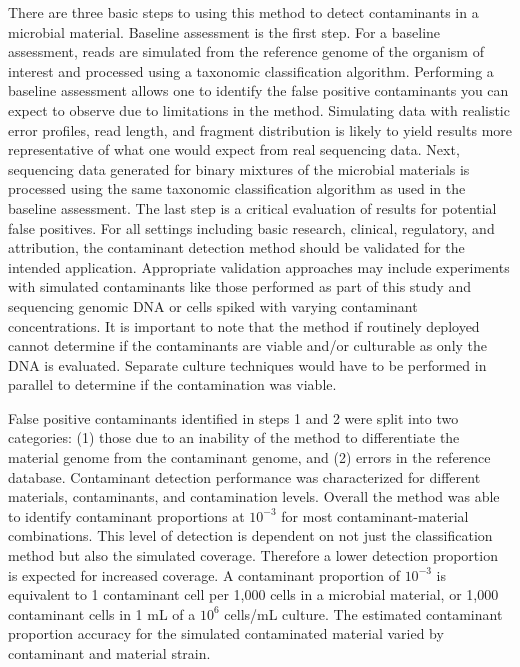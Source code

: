 \documentclass[fleqn,10pt,lineno]{wlpeerj}\usepackage[]{graphicx}\usepackage[]{color}
\begin{document}
There are three basic steps to using this method to detect contaminants in a microbial material. 
Baseline assessment is the first step. 
For a baseline assessment, reads are simulated from the reference genome of the organism of interest and processed using a taxonomic classification algorithm. 
Performing a baseline assessment allows one to identify the false positive contaminants you can expect to observe due to limitations in the method. 
Simulating data with realistic error profiles, read length, and fragment distribution is likely to yield results more representative of what one would expect from real sequencing data.
Next, sequencing data generated for binary mixtures of the microbial materials is processed using the same taxonomic classification algorithm as used in the baseline assessment.
The last step is a critical evaluation of results for potential false positives. 
For all settings including basic research, clinical, regulatory, and attribution, the contaminant detection method should be validated for the intended application.  
Appropriate validation approaches may include experiments with simulated contaminants like those performed as part of this study and sequencing genomic DNA or cells spiked with varying contaminant concentrations. It is important to note that the method if routinely deployed cannot determine if the contaminants are viable and/or culturable as only the DNA is evaluated.  Separate culture techniques would have to be performed in parallel to determine if the contamination was viable. 

False positive contaminants identified in steps 1 and 2 were split into two categories: (1) those due to an inability of the method to differentiate the material genome from the contaminant genome, and (2) errors in the reference database.
Contaminant detection performance was characterized for different materials, contaminants, and contamination levels.
Overall the method was able to identify contaminant proportions at $10^{-3}$ for most contaminant-material combinations. 
This level of detection is dependent on not just the classification method but also the simulated coverage. 
Therefore a lower detection proportion is expected for increased coverage. 
A contaminant proportion of $10^{-3}$ is equivalent to 1 contaminant cell per 1,000 cells in a microbial material, or 1,000 contaminant cells in 1 mL of a $10^{6}$ cells/mL culture.
The estimated contaminant proportion accuracy for the simulated contaminated material varied by contaminant and material strain.
\end{document}
